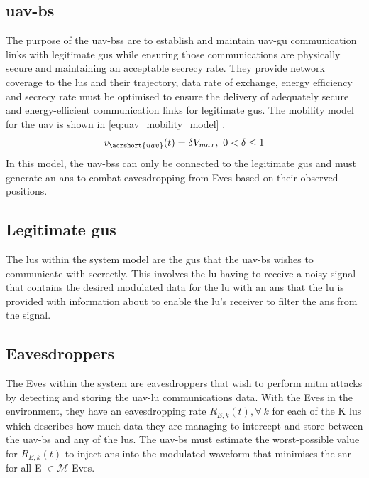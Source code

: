 \subsection{\texorpdfstring{\acrshort{uav}-\acrshort{bs}}{UAV-BS}}
The purpose of the \acrshort{uav}-\acrshort{bs}s are to establish and maintain \acrshort{uav}-\acrshort{gu} communication links with legitimate \acrshort{gu}s while ensuring those communications are physically secure and maintaining an acceptable secrecy rate.  
They provide network coverage to the \acrshort{lu}s and their trajectory, data rate of exchange, energy efficiency and secrecy rate must be optimised to ensure the delivery of adequately secure and energy-efficient communication links for legitimate \acrshort{gu}s. 
The mobility model for the \acrshort{uav} is shown in \ref{eq:uav_mobility_model} \cite{silvirianti_layerwise_2024}. 
\begin{equation} \label{eq:uav_mobility_model}
   v_{\acrshort{uav}} (t) = \delta V_{max}, \ 0 < \delta \le 1
\end{equation}
In this model, the \acrshort{uav}-\acrshort{bs}s can only be connected to the legitimate \acrshort{gu}s and must generate an \acrshort{ans} to combat eavesdropping from Eves based on their observed positions. 
\subsection{Legitimate \texorpdfstring{\acrshort{gu}s}{GUs}}
The \acrshort{lu}s within the system model are the \acrshort{gu}s that the \acrshort{uav}-\acrshort{bs} wishes to communicate with secrectly. 
This involves the \acrshort{lu} having to receive a noisy signal that contains the desired modulated data for the \acrshort{lu} with an \acrshort{ans} that the \acrshort{lu} is provided with information about to enable the \acrshort{lu}'s receiver to filter the \acrshort{ans} from the signal. 
\subsection{Eavesdroppers}
The Eves within the system are eavesdroppers that wish to perform \acrshort{mitm} attacks by detecting and storing the \acrshort{uav}-\acrshort{lu} communications data. 
With the Eves in the environment, they have an eavesdropping rate $R_{E, k} (t), \forall \ k$ for each of the K \acrshort{lu}s which describes how much data they are managing to intercept and store between the \acrshort{uav}-\acrshort{bs} and any of the \acrshort{lu}s. 
The \acrshort{uav}-\acrshort{bs} must estimate the worst-possible value for $R_{E, k} (t)$ to inject \acrshort{ans} into the modulated waveform that minimises the \acrshort{snr} for all E $\in \mathcal{M}$ Eves. 
